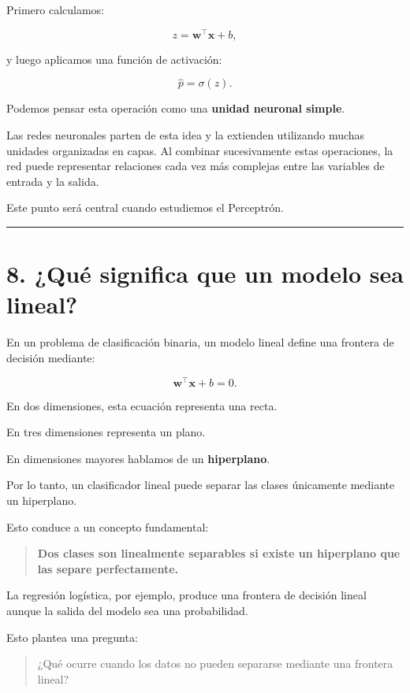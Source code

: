 \documentclass[
  letterpaper,
  DIV=11,
  numbers=noendperiod]{scrartcl}
\begin{document}
Primero calculamos:

\[
z=\mathbf{w}^{\top}\mathbf{x}+b,
\]

y luego aplicamos una función de activación:

\[
\hat p=\sigma(z).
\]

Podemos pensar esta operación como una \textbf{unidad neuronal simple}.

Las redes neuronales parten de esta idea y la extienden utilizando
muchas unidades organizadas en capas. Al combinar sucesivamente estas
operaciones, la red puede representar relaciones cada vez más complejas
entre las variables de entrada y la salida.

Este punto será central cuando estudiemos el Perceptrón.

\begin{center}\rule{0.5\linewidth}{0.5pt}\end{center}

\section{8. ¿Qué significa que un modelo sea
lineal?}\label{quuxe9-significa-que-un-modelo-sea-lineal}

En un problema de clasificación binaria, un modelo lineal define una
frontera de decisión mediante:

\[
\mathbf{w}^{\top}\mathbf{x}+b=0.
\]

En dos dimensiones, esta ecuación representa una recta.

En tres dimensiones representa un plano.

En dimensiones mayores hablamos de un \textbf{hiperplano}.

Por lo tanto, un clasificador lineal puede separar las clases únicamente
mediante un hiperplano.

Esto conduce a un concepto fundamental:

\begin{quote}
\textbf{Dos clases son linealmente separables si existe un hiperplano
que las separe perfectamente.}
\end{quote}

La regresión logística, por ejemplo, produce una frontera de decisión
lineal aunque la salida del modelo sea una probabilidad.

Esto plantea una pregunta:

\begin{quote}
¿Qué ocurre cuando los datos no pueden separarse mediante una frontera
lineal?
\end{quote}
\end{document}
